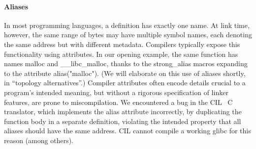 


\paragraph{Aliases}
In most programming languages, a definition has exactly one name. 
At link time, however, the same range of bytes may have multiple symbol names, 
each denoting the same address but with different metadata.
Compilers typically expose this functionality using attributes.
In our opening example, the same function has names \textsf{malloc} and \textsf{\_\_libc\_malloc},
thanks to the \textsf{strong\_alias} macros expanding to the attribute \textsf{alias("malloc")}.
(We will elaborate on this use of aliases shortly, in ``topology alternatives''.)
Compiler attributes often encode details crucial to a program's intended meaning,
but without a rigorous specification of linker features, are prone to miscompilation.
We encountered a bug in the CIL~\cite{necula-cil-2002} C translator, which implements the \textsf{alias} attribute incorrectly, by duplicating the function body in a separate definition,
violating the intended property that all aliases should have the same address.
CIL cannot compile a working \textsf{glibc} for this reason (among others).



